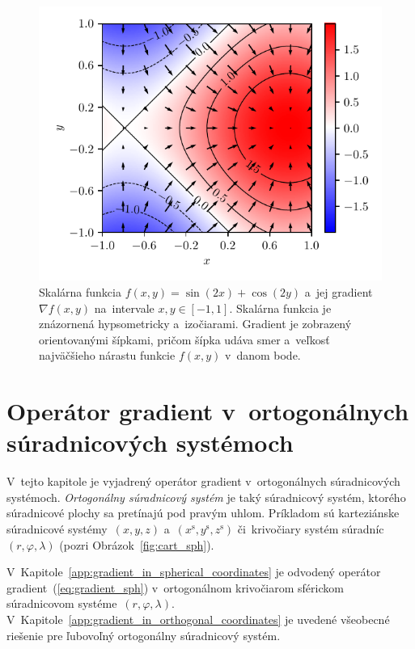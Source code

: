 \documentclass[a4paper,12pt]{book}
\begin{document}
\begin{figure}[bt]
\centering
\includegraphics{./fig-gradient.pdf}
\caption{Skalárna funkcia $f(x, y) = \sin(2x) + \cos(2y)$ a~jej gradient 
$\nabla f(x, y)$ na~intervale $x, y \in [-1, 1]$.  Skalárna funkcia je 
znázornená hypsometricky a~izočiarami.  Gradient je zobrazený orientovanými 
šípkami, pričom šípka udáva smer a~veľkosť najväčšieho nárastu funkcie $f(x, 
y)$ v~danom bode.}
\label{fig:f_gradf}
\end{figure}






\chapter{Operátor gradient v~ortogonálnych súradnicových systémoch}
\label{app:gradient_in_orthogonal_systems}

V~tejto kapitole je vyjadrený operátor gradient v~ortogonálnych súradnicových 
systémoch.  \emph{Ortogonálny súradnicový systém} je taký súradnicový systém, 
ktorého súradnicové plochy sa pretínajú pod pravým uhlom.  Príkladom sú 
karteziánske súradnicové systémy~$(x, y, z)$ a~$(x^\mathrm{s}, y^\mathrm{s}, 
z^\mathrm{s})$ či~krivočiary systém súradníc~$(r, \varphi, \lambda)$ (pozri 
Obrázok~\ref{fig:cart_sph}).

V~Kapitole~\ref{app:gradient_in_spherical_coordinates} je odvodený operátor 
gradient~(\ref{eq:gradient_sph}) v~ortogonálnom krivočiarom sférickom 
súradnicovom systéme~$(r, \varphi, \lambda)$.  
V~Kapitole~\ref{app:gradient_in_orthogonal_coordinates} je uvedené všeobecné 
riešenie pre ľubovoľný ortogonálny súradnicový systém.
\end{document}
